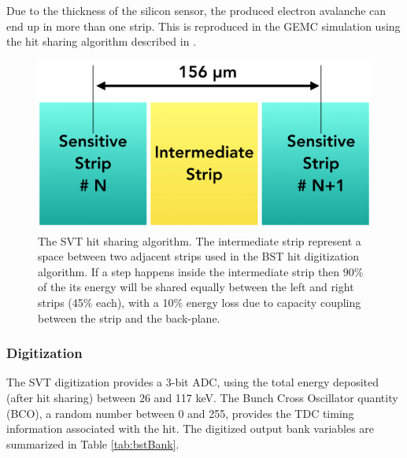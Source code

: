 Due to the thickness of the silicon sensor, the produced electron avalanche can end up in more than one strip. This
is reproduced in the GEMC simulation using the hit sharing algorithm described in .

\begin{figure}[t]
	\centering
	\includegraphics[width=0.99\columnwidth, keepaspectratio]{img/bstHitSharing.png}
	\caption{The SVT hit sharing algorithm. The intermediate strip represent a space between two adjacent strips
             used in the BST hit digitization algorithm. If a step happens inside the intermediate strip
             then $90\%$ of the its energy will be shared equally between the left and right strips (45$\%$ each),
             with a 10$\%$ energy loss due to capacity coupling between the strip and the back-plane.}
	\label{fig:bstHitSharing}
\end{figure}


\subsubsection{Digitization}

The SVT digitization provides a 3-bit ADC, using the total energy deposited (after hit sharing) between 26 and 117 keV.
The Bunch Cross Oscillator quantity (BCO), a random number between 0 and 255,
provides the TDC timing information associated with the hit.
The digitized output bank variables are summarized in Table \ref{tab:bstBank}.

